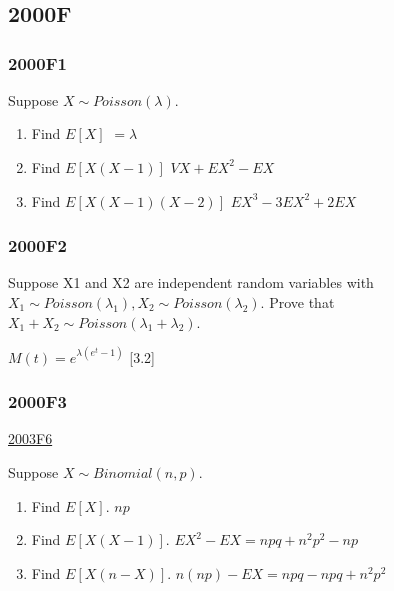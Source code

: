 \documentclass[10pt,twocolumn,portrait]{article}
\title{}
\author{}
\date{}
\begin{document}
\hypertarget{section}{%
\section{}\label{section}}

\hypertarget{f}{%
\subsection{2000F}\label{f}}

\hypertarget{f1}{%
\subsubsection{2000F1}\label{f1}}

Suppose \(X\sim Poisson(\lambda)\).

\begin{enumerate}
\def\labelenumi{\Alph{enumi})}
\item
  Find \(E[X]\) \(=\lambda\)
\item
  Find \(E[X(X-1)]\) \(VX+EX^2-EX\)
\item
  Find \(E[X(X-1)(X-2)]\) \(EX^3-3EX^2+2EX\)
\end{enumerate}

\hypertarget{f2}{%
\subsubsection{2000F2}\label{f2}}

Suppose X1 and X2 are independent random variables with
\(X_1\sim Poisson(\lambda_1),X_2\sim Poisson(\lambda_2)\). Prove that
\(X_1+X_2\sim Poisson(\lambda_1+\lambda_2)\).

\(M(t)=e^{\lambda(e^t-1)}\) {[}3.2{]}

\hypertarget{f3}{%
\subsubsection{2000F3}\label{f3}}

\protect\hyperlink{f6-1}{2003F6}

Suppose \(X\sim Binomial(n,p)\).

\begin{enumerate}
\def\labelenumi{\Alph{enumi})}
\item
  Find \(E[X]\). \(np\)
\item
  Find \(E[X(X-1)]\). \(EX^2-EX=npq+n^2p^2-np\)
\item
  Find \(E[X(n-X)]\). \(n(np)-EX=npq-npq+n^2p^2\)
\end{enumerate}
\end{document}
